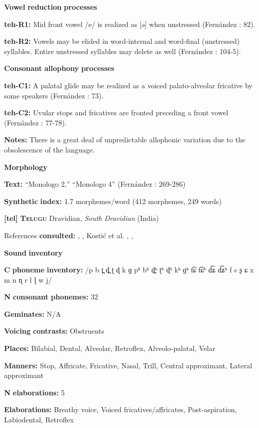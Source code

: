 \textbf{Vowel} \textbf{reduction} \textbf{processes}

\textbf{teh-R1:} Mid front vowel /e/ is realized as [ə] when unstressed (Fernández \citealt{Garay1998}: 82).

\textbf{teh-R2:} Vowels may be elided in word-internal and word-final (unstressed) syllables. Entire unstressed syllables may delete as well (Fernández \citealt{Garay1998}: 104-5).

\textbf{Consonant} \textbf{allophony} \textbf{processes}

\textbf{teh-C1:} A palatal glide may be realized as a voiced palato-alveolar fricative by some speakers (Fernández \citealt{Garay1998}: 73).

\textbf{teh-C2:} Uvular stops and fricatives are fronted preceding a front vowel (Fernández \citealt{Garay1998}: 77-78).

\textbf{Notes:} There is a great deal of unpredictable allophonic variation due to the obsolescence of the language.

\textbf{Morphology}

\textbf{Text:} “Monologo 2,” “Monologo 4” (Fernández \citealt{GarayHernández2006}: 269-286)

\textbf{Synthetic} \textbf{index:} 1.7 morphemes/word (412 morphemes, 249 words)

\textbf{[tel]}   \textbf{\textsc{Telugu}}    Dravidian, \textit{South} \textit{Dravidian} (India)

References \textbf{consulted:} \citet{BhaskararaoRay2017}, \citet{Kelley1963}, Kostić et al. , \citet{Krishnamurti1998}, \citet{Sailaja1999}

\textbf{Sound} \textbf{inventory}

\textbf{C} \textbf{phoneme} \textbf{inventory:} /p b t̪ d̪ ʈ ɖ k ɡ pʰ bʰ d̪ʰ ʈʰ ɖʰ kʰ ɡʰ t͡ɕ t͡ɕʰ d͡ʑ d͡ʑʰ f s ʂ ɕ x m n ɳ r l ɭ w j/

\textbf{N} \textbf{consonant} \textbf{phonemes:} 32

\textbf{Geminates:} N/A

\textbf{Voicing} \textbf{contrasts:} Obstruents

\textbf{Places:} Bilabial, Dental, Alveolar, Retroflex, Alveolo-palatal, Velar

\textbf{Manners:} Stop, Affricate, Fricative, Nasal, Trill, Central approximant, Lateral approximant

\textbf{N} \textbf{elaborations:} 5

\textbf{Elaborations:} Breathy voice, Voiced fricatives/affricates, Post-aspiration, Labiodental, Retroflex


